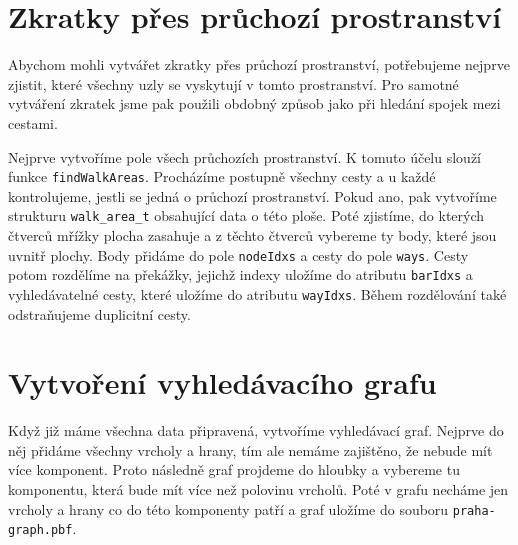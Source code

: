 \section{Zkratky přes průchozí prostranství}
Abychom mohli vytvářet zkratky přes průchozí prostranství, potřebujeme nejprve
zjistit, které všechny uzly se vyskytují v tomto prostranství. Pro samotné
vytváření zkratek jsme pak použili obdobný způsob jako při hledání spojek mezi
cestami. 

Nejprve vytvoříme pole všech průchozích prostranství.  K tomuto účelu
slouží funkce \verb|findWalkAreas|. Procházíme postupně všechny cesty a u každé
kontrolujeme, jestli se jedná o průchozí prostranství. Pokud ano, pak vytvoříme
strukturu \verb|walk_area_t| obsahující data o této ploše. Poté zjistíme, do
kterých čtverců mřížky plocha zasahuje a z těchto čtverců vybereme ty body,
které jsou uvnitř plochy. Body přidáme do pole \verb|nodeIdxs| a cesty do pole
\verb|ways|. Cesty potom rozdělíme na překážky, jejichž indexy uložíme do
atributu \verb|barIdxs| a vyhledávatelné cesty, které uložíme do atributu
\verb|wayIdxs|. Během rozdělování také odstraňujeme duplicitní cesty. 


\section{Vytvoření vyhledávacího grafu}
Když již máme všechna data připravená, vytvoříme vyhledávací graf. Nejprve do
něj přidáme všechny vrcholy a hrany, tím ale nemáme zajištěno, že nebude mít
více komponent. Proto následně graf projdeme do hloubky a vybereme tu
komponentu, která bude mít více než polovinu vrcholů. Poté v grafu necháme jen
vrcholy a hrany co do této komponenty patří a graf uložíme do souboru
\verb|praha-graph.pbf|. 

